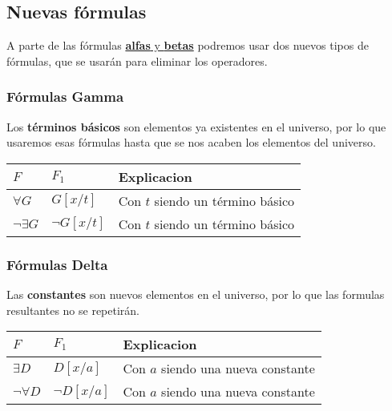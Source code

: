 \subsection{Nuevas fórmulas}
\noindent A parte de las fórmulas \underline{\textbf{alfas} y \textbf{betas}} podremos usar dos nuevos tipos de fórmulas, que se usarán para eliminar los operadores.
\subsubsection{Fórmulas Gamma}
\par \noindent Los \textbf{términos básicos} son elementos ya existentes en el universo, por lo que usaremos esas fórmulas hasta que se nos acaben los elementos del universo.
\begin{table}[h]
        \begin{tabular}{|l|l|l|}
                \hline
                \(F\)              & \(F_1\)         & Explicacion                        \\ \hline
                \(\forall G\)      & \(G[x/t]\)      & Con \(t\) siendo un término básico \\ \hline
                \(\neg \exists G\) & \(\neg G[x/t]\) & Con \(t\) siendo un término básico \\ \hline
        \end{tabular}
\end{table}
\subsubsection{Fórmulas Delta}
\par \noindent Las \textbf{constantes} son nuevos elementos en el universo, por lo que las formulas resultantes no se repetirán.
\begin{table}[h]
        \begin{tabular}{|l|l|l|}
                \hline
                \(F\)              & \(F_1\)         & Explicacion                          \\ \hline
                \(\exists D\)      & \(D[x/a]\)      & Con \(a\) siendo una nueva constante \\ \hline
                \(\neg \forall D\) & \(\neg D[x/a]\) & Con \(a\) siendo una nueva constante \\ \hline
        \end{tabular}
\end{table}